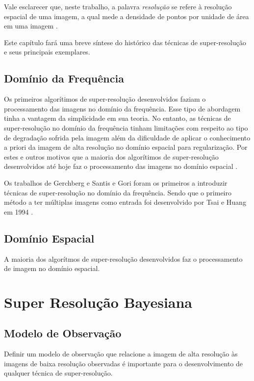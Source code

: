 \documentclass[12pt,openright,oneside,a4paper,english,brazil]{abntex2}
\begin{document}
Vale esclarecer que, neste trabalho, a palavra \textit{resolução} se refere à resolução espacial de uma imagem, a qual mede a densidade de pontos por unidade de área em uma imagem \cite{zibetti2007super}.

Este capítulo fará uma breve síntese do histórico das técnicas de super-resolução e seus principais exemplares.

\section{Domínio da Frequência}

Os primeiros algorítimos de super-resolução desenvolvidos faziam o processamento das imagens no domínio da frequência.
Esse tipo de abordagem tinha a vantagem da simplicidade em sua teoria.
No entanto, as técnicas de super-resolução no domínio da frequência tinham limitações com respeito ao tipo de degradação sofrida pela imagem além da dificuldade de aplicar o conhecimento a priori da imagem de alta resolução no domínio espacial para regularização.
Por estes e outros motivos que a maioria dos algorítimos de super-resolução desenvolvidos até hoje faz o processamento das imagens no domínio espacial \cite{park2003super}.

Os trabalhos de Gerchberg \cite{Gerchberg1974} e Santis e Gori \cite{de1975iterative} foram os primeiros a introduzir técnicas de super-resolução no domínio da frequência.
Sendo que o primeiro método a ter múltiplas imagens como entrada foi desenvolvido por Tsai e Huang em 1994 \cite{nasrollahi2014super}.



\section{Domínio Espacial}
A maioria dos algorítmos de super-resolução desenvolvidos faz o processamento de imagem no domínio espacial. \cite{nasrollahi2014super}


\chapter{Super Resolução Bayesiana}
\section{Modelo de Observação}
\label{sec:obsmodel}

Definir um modelo de observação que relacione a imagem de alta resolução às imagens de baixa resolução observadas é importante para o desenvolvimento de qualquer técnica de super-resolução.
\end{document}
